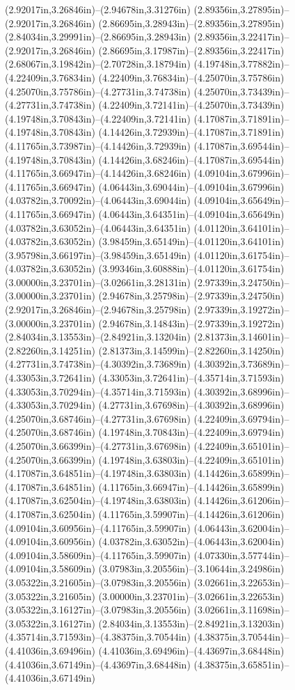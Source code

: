 (2.92017in,3.26846in)--(2.94678in,3.31276in) (2.89356in,3.27895in)--(2.92017in,3.26846in) (2.86695in,3.28943in)--(2.89356in,3.27895in) (2.84034in,3.29991in)--(2.86695in,3.28943in) (2.89356in,3.22417in)--(2.92017in,3.26846in) (2.86695in,3.17987in)--(2.89356in,3.22417in) (2.68067in,3.19842in)--(2.70728in,3.18794in) (4.19748in,3.77882in)--(4.22409in,3.76834in) (4.22409in,3.76834in)--(4.25070in,3.75786in) (4.25070in,3.75786in)--(4.27731in,3.74738in) (4.25070in,3.73439in)--(4.27731in,3.74738in) (4.22409in,3.72141in)--(4.25070in,3.73439in) (4.19748in,3.70843in)--(4.22409in,3.72141in) (4.17087in,3.71891in)--(4.19748in,3.70843in) (4.14426in,3.72939in)--(4.17087in,3.71891in) (4.11765in,3.73987in)--(4.14426in,3.72939in) (4.17087in,3.69544in)--(4.19748in,3.70843in) (4.14426in,3.68246in)--(4.17087in,3.69544in) (4.11765in,3.66947in)--(4.14426in,3.68246in) (4.09104in,3.67996in)--(4.11765in,3.66947in) (4.06443in,3.69044in)--(4.09104in,3.67996in) (4.03782in,3.70092in)--(4.06443in,3.69044in) (4.09104in,3.65649in)--(4.11765in,3.66947in) (4.06443in,3.64351in)--(4.09104in,3.65649in) (4.03782in,3.63052in)--(4.06443in,3.64351in) (4.01120in,3.64101in)--(4.03782in,3.63052in) (3.98459in,3.65149in)--(4.01120in,3.64101in) (3.95798in,3.66197in)--(3.98459in,3.65149in) (4.01120in,3.61754in)--(4.03782in,3.63052in) (3.99346in,3.60888in)--(4.01120in,3.61754in) (3.00000in,3.23701in)--(3.02661in,3.28131in) (2.97339in,3.24750in)--(3.00000in,3.23701in) (2.94678in,3.25798in)--(2.97339in,3.24750in) (2.92017in,3.26846in)--(2.94678in,3.25798in) (2.97339in,3.19272in)--(3.00000in,3.23701in) (2.94678in,3.14843in)--(2.97339in,3.19272in) (2.84034in,3.13553in)--(2.84921in,3.13204in) (2.81373in,3.14601in)--(2.82260in,3.14251in) (2.81373in,3.14599in)--(2.82260in,3.14250in) (4.27731in,3.74738in)--(4.30392in,3.73689in) (4.30392in,3.73689in)--(4.33053in,3.72641in) (4.33053in,3.72641in)--(4.35714in,3.71593in) (4.33053in,3.70294in)--(4.35714in,3.71593in) (4.30392in,3.68996in)--(4.33053in,3.70294in) (4.27731in,3.67698in)--(4.30392in,3.68996in) (4.25070in,3.68746in)--(4.27731in,3.67698in) (4.22409in,3.69794in)--(4.25070in,3.68746in) (4.19748in,3.70843in)--(4.22409in,3.69794in) (4.25070in,3.66399in)--(4.27731in,3.67698in) (4.22409in,3.65101in)--(4.25070in,3.66399in) (4.19748in,3.63803in)--(4.22409in,3.65101in) (4.17087in,3.64851in)--(4.19748in,3.63803in) (4.14426in,3.65899in)--(4.17087in,3.64851in) (4.11765in,3.66947in)--(4.14426in,3.65899in) (4.17087in,3.62504in)--(4.19748in,3.63803in) (4.14426in,3.61206in)--(4.17087in,3.62504in) (4.11765in,3.59907in)--(4.14426in,3.61206in) (4.09104in,3.60956in)--(4.11765in,3.59907in) (4.06443in,3.62004in)--(4.09104in,3.60956in) (4.03782in,3.63052in)--(4.06443in,3.62004in) (4.09104in,3.58609in)--(4.11765in,3.59907in) (4.07330in,3.57744in)--(4.09104in,3.58609in) (3.07983in,3.20556in)--(3.10644in,3.24986in) (3.05322in,3.21605in)--(3.07983in,3.20556in) (3.02661in,3.22653in)--(3.05322in,3.21605in) (3.00000in,3.23701in)--(3.02661in,3.22653in) (3.05322in,3.16127in)--(3.07983in,3.20556in) (3.02661in,3.11698in)--(3.05322in,3.16127in) (2.84034in,3.13553in)--(2.84921in,3.13203in) (4.35714in,3.71593in)--(4.38375in,3.70544in) (4.38375in,3.70544in)--(4.41036in,3.69496in) (4.41036in,3.69496in)--(4.43697in,3.68448in) (4.41036in,3.67149in)--(4.43697in,3.68448in) (4.38375in,3.65851in)--(4.41036in,3.67149in) 
